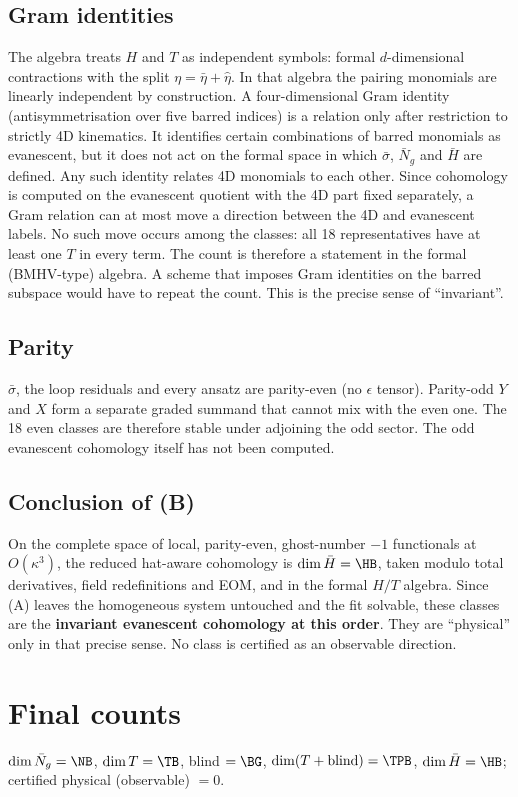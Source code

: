 \documentclass[11pt]{article}
\begin{document}
\subsection{Gram identities}
The algebra treats $H$ and $T$ as independent symbols: formal $d$-dimensional contractions with the split
$\eta=\bar\eta+\hat\eta$. In that algebra the pairing monomials are linearly independent by construction. A
four-dimensional Gram identity (antisymmetrisation over five barred indices) is a relation only after restriction to
strictly 4D kinematics. It identifies certain combinations of barred monomials as evanescent, but it does not act on the
formal space in which $\bar\sigma$, $\bar N_g$ and $\bar H$ are defined. Any such identity relates 4D monomials to each
other. Since cohomology is computed on the evanescent quotient with the 4D part fixed separately, a Gram relation can at
most move a direction between the 4D and evanescent labels. No such move occurs among the classes: all 18
representatives have at least one $T$ in every term. The count \HB{} is therefore a statement in the formal
(BMHV-type) algebra. A scheme that imposes Gram identities on the barred subspace would have to repeat the count. This
is the precise sense of ``invariant''.

\subsection{Parity}
$\bar\sigma$, the loop residuals and every ansatz are parity-even (no $\epsilon$ tensor). Parity-odd $Y$ and $X$ form a
separate graded summand that cannot mix with the even one. The 18 even classes are therefore stable under adjoining the
odd sector. The odd evanescent cohomology itself has not been computed.

\subsection{Conclusion of (B)}
On the complete space of local, parity-even, ghost-number $-1$ functionals at $O(\kappa^3)$, the reduced hat-aware
cohomology is $\dim\bar H=\HB$, taken modulo total derivatives, field redefinitions and EOM, and in the formal $H/T$
algebra. Since (A) leaves the homogeneous system untouched and the fit solvable, these \HB{} classes are the
\textbf{invariant evanescent cohomology at this order}. They are ``physical'' only in that precise sense. No class is
certified as an observable direction.

\section{Final counts}
$\dim\bar N_g=\NB$, $\dim T=\TB$, blind $=\BG$, $\dim(T+\text{blind})=\TPB$, $\dim\bar H=\HB$; certified physical
(observable) $=0$.
\end{document}
